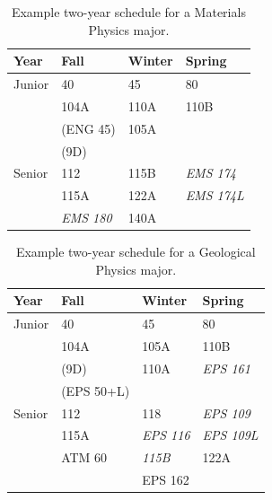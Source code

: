 \documentclass[12pt]{article}
\begin{document}
\begin{table}[htbp]
\caption{\label{tbl:sched-materials} Example two-year schedule for a
  Materials Physics major.}
\begin{center}
\begin{tabular}{|l|l|l|l|}
\hline
Year      & Fall    & Winter & Spring \\
\hline
Junior    & 40             & 45         & 80 \\
          & 104A           & 110A       & 110B \\
          & (ENG 45)       & 105A       & \\         
          & (9D)           &            & \\
\hline
Senior    & 112          & 115B     & {\it EMS 174}\\
          & 115A           & 122A       & {\it EMS 174L}\\
          & {\it EMS 180}  & 140A       & \\
\hline
\end{tabular}
\end{center}
\end{table}

\begin{table}[htbp]
\caption{\label{tbl:sched-geophysics} Example two-year schedule for a
  Geological Physics major.}
\begin{center}
\begin{tabular}{|l|l|l|l|}
\hline
Year      & Fall    & Winter & Spring \\


\hline
Junior    & 40         & 45           & 80 \\ 
          & 104A       & 105A         & 110B \\ 
          & (9D)       & 110A         & {\it EPS 161} \\
          & (EPS 50+L) &              & \\
\hline
Senior   & 112         & 118          & {\it EPS 109}\\
         & 115A          & {\it EPS 116} & {\it EPS 109L}\\
         & ATM 60        & {\it 115B}   & 122A \\
         &               & EPS 162       & \\
         
\hline
\end{tabular}
\end{center}
\end{table}
\end{document}

